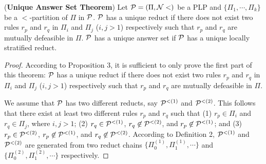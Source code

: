 \documentclass{tlp}
\begin{document}
\begin{theorem}

({\bf Unique Answer Set Theorem})
Let ${\cal P}=(\Pi,{\cal N}<)$ be a PLP and $\{\Pi_{1},\cdots, \Pi_{k}\}$
be a $<$-partition of $\Pi$ in ${\cal P}$.
${\cal P}$ has a unique reduct if there does not exist
two rules $r_{p}$ and $r_{q}$
in $\Pi_{i}$ and $\Pi_{j}$ ($i,j>1$) respectively such that
$r_{p}$ and $r_{q}$ are mutually defeasible in $\Pi$.
${\cal P}$ has a unique answer set if ${\cal P}$ has a unique locally
stratified reduct.
\end{theorem}

\noindent
\begin{proof}
According to Proposition 3, it is sufficient to only prove the
first part of this theorem: ${\cal P}$ has a unique
reduct if there does not exist
two rules $r_{p}$ and $r_{q}$
in $\Pi_{i}$ and $\Pi_{j}$ ($i,j>1$) respectively such that
$r_{p}$ and $r_{q}$ are mutually defeasible in $\Pi$.

We assume that ${\cal P}$ has two different reducts, say
${\cal P}^{<(1)}$ and ${\cal P}^{<(2)}$. This follows that there exist at least
two different rules $r_{p}$ and $r_{q}$ such that (1) $r_{p} \in \Pi_{i}$ and
$r_{q}\in \Pi_{j}$, where $i, j>1$;
(2) $r_{q}\in {\cal P}^{<(1)}$, $r_{q}\not\in {\cal P}^{<(2)}$, and
$r_{p}\not\in {\cal P}^{<(1)}$; and
(3) $r_{p}\in {\cal P}^{<(2)}$, $r_{p}\not\in {\cal P}^{<(1)}$, and
$r_{q}\not\in {\cal P}^{<(2)}$.
According to Definition 2, ${\cal P}^{<(1)}$ and
${\cal P}^{<(2)}$ are generated from two
reduct chains $\{\Pi_{0}^{(1)}, \Pi_{1}^{(1)}, \cdots\}$ and
$\{\Pi_{0}^{(2)}, \Pi_{1}^{(2)}, \cdots\}$ respectively.


\end{proof}
\end{document}
